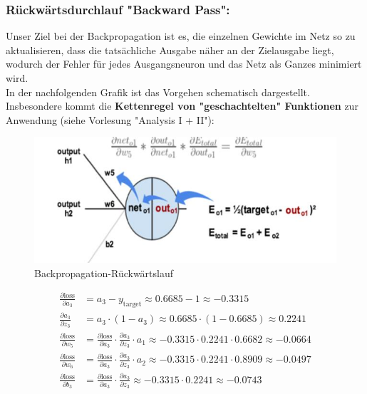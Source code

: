 \documentclass[12pt]{article}
\begin{document}
\subsubsection{Rückwärtsdurchlauf "Backward Pass":}
Unser Ziel bei der Backpropagation ist es, die einzelnen Gewichte im Netz so zu aktualisieren, dass die tatsächliche Ausgabe näher an der Zielausgabe liegt, wodurch der Fehler für jedes Ausgangsneuron und das Netz als Ganzes minimiert wird.\\
In der nachfolgenden Grafik ist das Vorgehen schematisch dargestellt. Insbesondere kommt die \textbf{Kettenregel von "geschachtelten" Funktionen} zur Anwendung (siehe Vorlesung "Analysis I + II"):

\begin{figure}[htb]
  \centering
  \vspace*{0.5cm}
 \includegraphics{Backpropagation-BP} 
  \vspace*{-0.5cm}
  \caption{Backpropagation-Rückwärtslauf}
\end{figure}
{\color{red}{*******************************************************************\\ ******* ab hier bis Ende subsection ist dass noch anzupassen ******* \\
********************************************************************\\}}
\[
\begin{aligned}
\frac{\partial \text{loss}}{\partial a_3} &= a_3 - y_{\text{target}} \approx 0.6685 - 1 \approx -0.3315 \\
\frac{\partial a_3}{\partial z_3} &= a_3 \cdot (1 - a_3) \approx 0.6685 \cdot (1 - 0.6685) \approx 0.2241 \\
\frac{\partial \text{loss}}{\partial w_5} &= \frac{\partial \text{loss}}{\partial a_3} \cdot \frac{\partial a_3}{\partial z_3} \cdot a_1 \approx -0.3315 \cdot 0.2241 \cdot 0.6682 \approx -0.0664 \\
\frac{\partial \text{loss}}{\partial w_6} &= \frac{\partial \text{loss}}{\partial a_3} \cdot \frac{\partial a_3}{\partial z_3} \cdot a_2 \approx -0.3315 \cdot 0.2241 \cdot 0.8909 \approx -0.0497 \\
\frac{\partial \text{loss}}{\partial b_3} &= \frac{\partial \text{loss}}{\partial a_3} \cdot \frac{\partial a_3}{\partial z_3} \approx -0.3315 \cdot 0.2241 \approx -0.0743 \\
\end{aligned}
\] \\[0.2cm]
\end{document}
